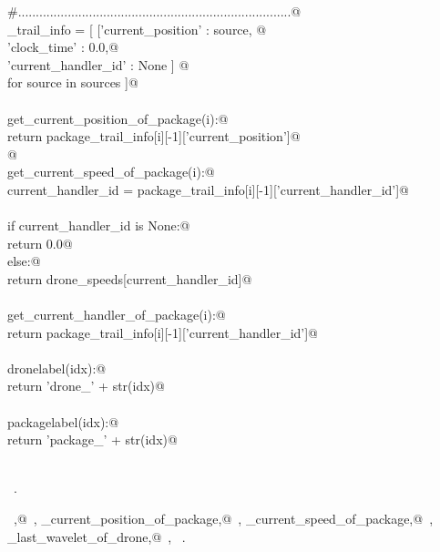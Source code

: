 \documentclass[10pt, english, oneside]{report}
\begin{document}
\begin{flushleft}
\begin{list}{}{}
\mbox{}\verb@#.............................................................................@\\
\mbox{}\verb@package_trail_info  = [ [{'current_position'   : source, @\\
\mbox{}\verb@                          'clock_time'         : 0.0,@\\
\mbox{}\verb@                          'current_handler_id' : None }] @\\
\mbox{}\verb@                        for source in sources ]@\\
\mbox{}\verb@@\\
\mbox{}\verb@def get_current_position_of_package(i):@\\
\mbox{}\verb@         return package_trail_info[i][-1]['current_position']@\\
\mbox{}\verb@    @\\
\mbox{}\verb@def get_current_speed_of_package(i):@\\
\mbox{}\verb@         current_handler_id = package_trail_info[i][-1]['current_handler_id']@\\
\mbox{}\verb@@\\
\mbox{}\verb@         if current_handler_id is None:@\\
\mbox{}\verb@              return 0.0@\\
\mbox{}\verb@         else:@\\
\mbox{}\verb@              return drone_speeds[current_handler_id]@\\
\mbox{}\verb@@\\
\mbox{}\verb@def get_current_handler_of_package(i):@\\
\mbox{}\verb@         return package_trail_info[i][-1]['current_handler_id']@\\
\mbox{}\verb@@\\
\mbox{}\verb@def dronelabel(idx):@\\
\mbox{}\verb@    return 'drone_' + str(idx)@\\
\mbox{}\verb@@\\
\mbox{}\verb@def packagelabel(idx):@\\
\mbox{}\verb@    return 'package_' + str(idx)@\\
\mbox{}\verb@@\\
\mbox{}\verb@@{\NWsep}
\end{list}
\vspace{-1.5ex}
\footnotesize
\begin{list}{}{\setlength{\itemsep}{-\parsep}\setlength{\itemindent}{-\leftmargin}}
\item \NWtxtMacroRefIn\ .
\item \NWtxtIdentsDefed\nobreak\  \verb@dronelabel,@\nobreak\ \NWtxtIdentsNotUsed, \verb@get_current_position_of_package,@\nobreak\ \NWtxtIdentsNotUsed, \verb@get_current_speed_of_package,@\nobreak\ \NWtxtIdentsNotUsed, \verb@get_last_wavelet_of_drone,@\nobreak\ \NWtxtIdentsNotUsed, \verb@packagelabel@\nobreak\ .
\item{}
\end{list}
\vspace{4ex}
\end{flushleft}
\end{document}
